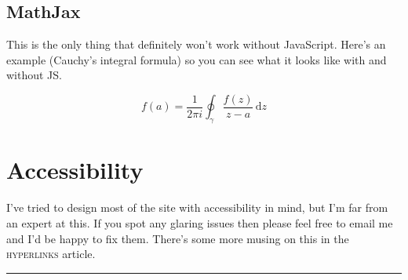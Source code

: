 \documentclass[a4paper,11pt,oneside,article]{memoir}
\begin{document}
\section{MathJax}

This is the only thing that definitely won't work without JavaScript. Here's an example (Cauchy's integral formula) so you can see what it looks like with and without JS.

\begin{equation*}
  f(a) = \frac{1}{2 \pi i} \oint_{\gamma} \frac{f(z)}{z - a}\, \mathrm{d}z
\end{equation*}

\chapter[Accessibility]{Accessibility}

I've tried to design most of the site with accessibility in mind, but I'm far from an expert at this. If you spot any glaring issues then please feel free to email me and I'd be happy to fix them. There's some more musing on this in the \textsc{hyperlinks} article.
\vspace*{3.5ex}
\hrule
\vspace*{1.5ex}
\printpagenotes
\printbibliography
\end{document}
